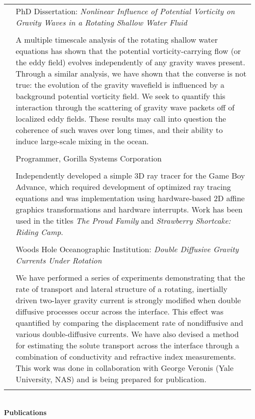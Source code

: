 \documentclass[10pt, letterpaper]{article}
\begin{document}
\begin{tabular}{lp{6.15in}}
& PhD Dissertation: \emph{Nonlinear Influence of Potential Vorticity on Gravity Waves in a Rotating Shallow Water Fluid}\\
\\
& A multiple timescale analysis of the rotating shallow water equations has shown that the potential vorticity-carrying flow (or the eddy field) evolves independently of any gravity waves present. Through a similar analysis, we have shown that the converse is not true: the evolution of the gravity wavefield is influenced by a background potential vorticity field. We seek to quantify this interaction through the scattering of gravity wave packets off of localized eddy fields. These results may call into question the coherence of such waves over long times, and their ability to induce large-scale mixing in the ocean.\\
\\
& Programmer, Gorilla Systems Corporation \\
\\
& Independently developed a simple 3D ray tracer for the Game Boy Advance, which required development of optimized ray tracing equations and was implementation using hardware-based 2D affine graphics transformations and hardware interrupts. Work has been used in the titles \emph{The Proud Family} and \emph{Strawberry Shortcake: Riding Camp}. \\
\\
 & Woods Hole Oceanographic Institution: \emph{Double Diffusive Gravity Currents Under Rotation} \\
\\
& We have performed a series of experiments demonstrating that the rate of transport and lateral structure of a rotating, inertially driven two-layer gravity current is strongly modified when double diffusive processes occur across the interface. This effect was quantified by comparing the displacement rate of nondiffusive and various double-diffusive currents. We have also devised a method for estimating the solute transport across the interface through a combination of conductivity and refractive index measurements. This work was done in collaboration with George Veronis (Yale University, NAS) and is being prepared for publication. \\
\\
\end{tabular}
\\
\textbf{Publications} \\
\end{document}
